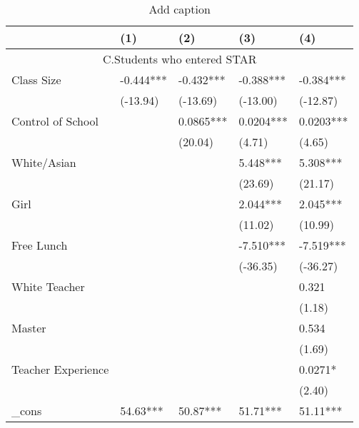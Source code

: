 \documentclass{article}
\begin{document}
\begin{table}[htbp]
  \centering
  \caption{Add caption}
    \begin{tabular}{lllrr}
    \toprule
          & (1)   & (2)   & \multicolumn{1}{l}{(3)} & \multicolumn{1}{l}{(4)} \\
    \midrule
    \multicolumn{5}{c}{C.Students who entered STAR} \\
    Class Size & -0.444*** & -0.432*** & \multicolumn{1}{l}{-0.388***} & \multicolumn{1}{l}{-0.384***} \\
          & (-13.94) & (-13.69) & \multicolumn{1}{l}{(-13.00)} & \multicolumn{1}{l}{(-12.87)} \\
    Control of School &       & 0.0865*** & \multicolumn{1}{l}{0.0204***} & \multicolumn{1}{l}{0.0203***} \\
          &       & (20.04) & \multicolumn{1}{l}{(4.71)} & \multicolumn{1}{l}{(4.65)} \\
    White/Asian &       &       & \multicolumn{1}{l}{5.448***} & \multicolumn{1}{l}{5.308***} \\
          &       &       & \multicolumn{1}{l}{(23.69)} & \multicolumn{1}{l}{(21.17)} \\
    Girl  &       &       & \multicolumn{1}{l}{2.044***} & \multicolumn{1}{l}{2.045***} \\
          &       &       & \multicolumn{1}{l}{(11.02)} & \multicolumn{1}{l}{(10.99)} \\
    Free Lunch &       &       & \multicolumn{1}{l}{-7.510***} & \multicolumn{1}{l}{-7.519***} \\
          &       &       & \multicolumn{1}{l}{(-36.35)} & \multicolumn{1}{l}{(-36.27)} \\
    White Teacher &       &       & \multicolumn{1}{l}{} & \multicolumn{1}{l}{0.321} \\
          &       &       & \multicolumn{1}{l}{} & \multicolumn{1}{l}{(1.18)} \\
    Master &       &       & \multicolumn{1}{l}{} & \multicolumn{1}{l}{0.534} \\
          &       &       & \multicolumn{1}{l}{} & \multicolumn{1}{l}{(1.69)} \\
    Teacher Experience &       &       & \multicolumn{1}{l}{} & \multicolumn{1}{l}{0.0271*} \\
          &       &       & \multicolumn{1}{l}{} & \multicolumn{1}{l}{(2.40)} \\
    \_cons & 54.63*** & 50.87*** & \multicolumn{1}{l}{51.71***} & \multicolumn{1}{l}{51.11***} \\

\end{tabular}
\end{table}
\end{document}
